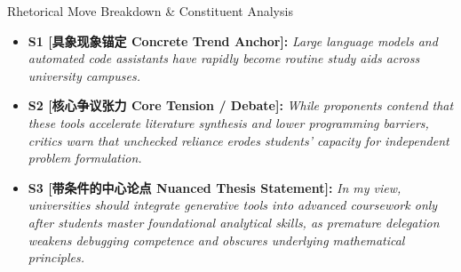 \begin{TipBox}{Rhetorical Move Breakdown \& Constituent Analysis}
\begin{itemize}[leftmargin=1.5em]
  \item \textbf{S1 [具象现象锚定 Concrete Trend Anchor]:} \textit{Large language models and automated code assistants have rapidly become routine study aids across university campuses.}\par{}
  \item \textbf{S2 [核心争议张力 Core Tension / Debate]:} \textit{While proponents contend that these tools accelerate literature synthesis and lower programming barriers, critics warn that unchecked reliance erodes students' capacity for independent problem formulation.}\par{}
  \item \textbf{S3 [带条件的中心论点 Nuanced Thesis Statement]:} \textit{In my view, universities should integrate generative tools into advanced coursework only after students master foundational analytical skills, as premature delegation weakens debugging competence and obscures underlying mathematical principles.}\par{}
\end{itemize}
\end{TipBox}
\medskip
